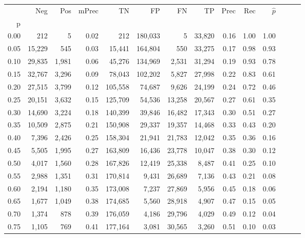 \begin{tabular}{rrrrrrrrrrrrrr}
\toprule
{} &     Neg &    Pos & mPrec &       TN &       FP &      FN &      TP &  Prec &   Rec & $\hat{p}$ \\
p    &         &        &       &          &          &         &         &       &       &           \\
\midrule
0.00 &     212 &      5 &  0.02 &      212 &  180,033 &       5 &  33,820 &  0.16 &  1.00 &      1.00 \\
0.05 &  15,229 &    545 &  0.03 &   15,441 &  164,804 &     550 &  33,275 &  0.17 &  0.98 &      0.93 \\
0.10 &  29,835 &  1,981 &  0.06 &   45,276 &  134,969 &   2,531 &  31,294 &  0.19 &  0.93 &      0.78 \\
0.15 &  32,767 &  3,296 &  0.09 &   78,043 &  102,202 &   5,827 &  27,998 &  0.22 &  0.83 &      0.61 \\
0.20 &  27,515 &  3,799 &  0.12 &  105,558 &   74,687 &   9,626 &  24,199 &  0.24 &  0.72 &      0.46 \\
0.25 &  20,151 &  3,632 &  0.15 &  125,709 &   54,536 &  13,258 &  20,567 &  0.27 &  0.61 &      0.35 \\
0.30 &  14,690 &  3,224 &  0.18 &  140,399 &   39,846 &  16,482 &  17,343 &  0.30 &  0.51 &      0.27 \\
0.35 &  10,509 &  2,875 &  0.21 &  150,908 &   29,337 &  19,357 &  14,468 &  0.33 &  0.43 &      0.20 \\
0.40 &   7,396 &  2,426 &  0.25 &  158,304 &   21,941 &  21,783 &  12,042 &  0.35 &  0.36 &      0.16 \\
0.45 &   5,505 &  1,995 &  0.27 &  163,809 &   16,436 &  23,778 &  10,047 &  0.38 &  0.30 &      0.12 \\
0.50 &   4,017 &  1,560 &  0.28 &  167,826 &   12,419 &  25,338 &   8,487 &  0.41 &  0.25 &      0.10 \\
0.55 &   2,988 &  1,351 &  0.31 &  170,814 &    9,431 &  26,689 &   7,136 &  0.43 &  0.21 &      0.08 \\
0.60 &   2,194 &  1,180 &  0.35 &  173,008 &    7,237 &  27,869 &   5,956 &  0.45 &  0.18 &      0.06 \\
0.65 &   1,677 &  1,049 &  0.38 &  174,685 &    5,560 &  28,918 &   4,907 &  0.47 &  0.15 &      0.05 \\
0.70 &   1,374 &    878 &  0.39 &  176,059 &    4,186 &  29,796 &   4,029 &  0.49 &  0.12 &      0.04 \\
0.75 &   1,105 &    769 &  0.41 &  177,164 &    3,081 &  30,565 &   3,260 &  0.51 &  0.10 &      0.03 \\

\end{tabular}
